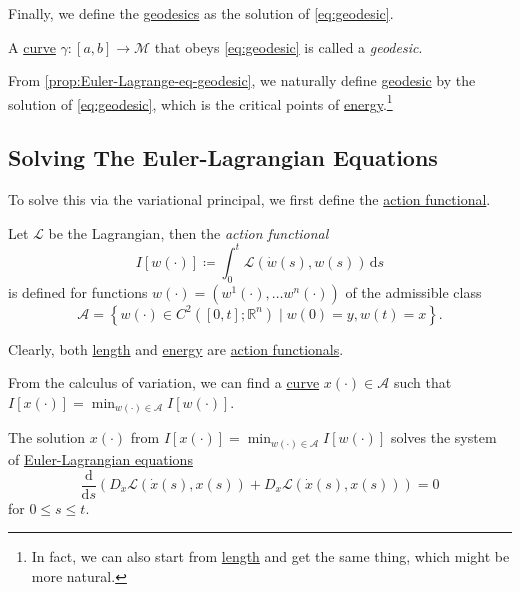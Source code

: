 Finally, we define the \hyperref[def:geodesic]{geodesics} as the solution of \autoref{eq:geodesic}.

\begin{definition}[Geodesic]\label{def:geodesic}
	A \hyperref[def:curve]{curve} \(\gamma \colon [a, b] \to \mathcal{M} \) that obeys \autoref{eq:geodesic} is called a \emph{geodesic}.
\end{definition}

\begin{intuition}
	From \autoref{prop:Euler-Lagrange-eq-geodesic}, we naturally define \hyperref[def:geodesic]{geodesic} by the solution of \autoref{eq:geodesic}, which is the critical points of \hyperref[def:energy]{energy}.\footnote{In fact, we can also start from \hyperref[def:length]{length} and get the same thing, which might be more natural.}
\end{intuition}

\subsection{Solving The Euler-Lagrangian Equations}
To solve this via the variational principal, we first define the \hyperref[def:action-functional]{action functional}.

\begin{definition}\label{def:action-functional}
	Let \(\mathcal{L} \) be the Lagrangian, then the \emph{action functional}
	\[
		I[w(\cdot)] \coloneqq \int_{0}^{t} \mathcal{L} (\dot{w}(s), w(s)) \,\mathrm{d}s
	\]
	is defined for functions \(w(\cdot) = (w^1(\cdot), \dots w^n(\cdot))\) of the admissible class
	\[
		\mathcal{A} =\left\{ w(\cdot)\in C^2([0, t]; \mathbb{R} ^n) \mid w(0)= y, w(t)= x\right\}.
	\]
\end{definition}

\begin{eg}
	Clearly, both \hyperref[def:length]{length} and \hyperref[def:energy]{energy} are \hyperref[def:action-functional]{action functionals}.
\end{eg}

From the calculus of variation, we can find a \hyperref[def:curve]{curve} \(x(\cdot)\in \mathcal{A} \) such that \(I[x(\cdot)] = \min _{w(\cdot)\in \mathcal{A} }I[w(\cdot)]\).

\begin{theorem}\label{thm:Euler-Lagrangian-eq}
	The solution \(x(\cdot)\) from \(I[x(\cdot)] = \min _{w(\cdot)\in \mathcal{A} }I[w(\cdot)]\) solves the system of \href{https://en.wikipedia.org/wiki/Euler-Lagrange_equation}{Euler-Lagrangian equations}
	\[
		\frac{\mathrm{d}}{\mathrm{d}s} \left( D_{\dot{x}} \mathcal{L} (\dot{x}(s), x(s)) + D_x \mathcal{L} (\dot{x}(s), x(s)) \right) = 0
	\]
	for \(0 \leq s \leq t\).
\end{theorem}